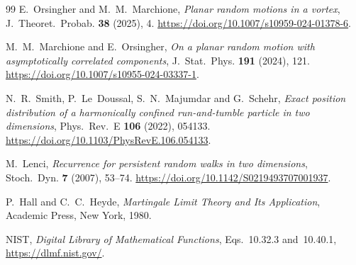 \documentclass[11pt]{article}
\theoremstyle{definition}
\theoremstyle{remark}
\begin{document}
\begin{thebibliography}{99}
E.~Orsingher and M.~M.~Marchione, \emph{Planar random motions in a vortex},
J.~Theoret.~Probab. \textbf{38} (2025), 4.
\url{https://doi.org/10.1007/s10959-024-01378-6}.

M.~M.~Marchione and E.~Orsingher, \emph{On a planar random motion with
asymptotically correlated components}, J.~Stat.~Phys. \textbf{191} (2024), 121.
\url{https://doi.org/10.1007/s10955-024-03337-1}.

N.~R.~Smith, P.~Le~Doussal, S.~N.~Majumdar and G.~Schehr, \emph{Exact position
distribution of a harmonically confined run-and-tumble particle in two
dimensions}, Phys.~Rev.~E \textbf{106} (2022), 054133.
\url{https://doi.org/10.1103/PhysRevE.106.054133}.

M.~Lenci, \emph{Recurrence for persistent random walks in two dimensions},
Stoch.~Dyn. \textbf{7} (2007), 53--74.
\url{https://doi.org/10.1142/S0219493707001937}.

P.~Hall and C.~C.~Heyde, \emph{Martingale Limit Theory and Its
Application}, Academic Press, New York, 1980.

NIST, \emph{Digital Library of Mathematical Functions}, Eqs.~10.32.3
and~10.40.1, \url{https://dlmf.nist.gov/}.

\end{thebibliography}
\end{document}
